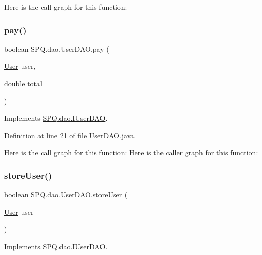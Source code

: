 Here is the call graph for this function\+:
\mbox{\label{class_s_p_q_1_1dao_1_1_user_d_a_o_a8223c677b1ae55147860ea533be434a7}} 
\subsubsection{\texorpdfstring{pay()}{pay()}}
{\footnotesize\ttfamily boolean S\+P\+Q.\+dao.\+User\+D\+A\+O.\+pay (\begin{DoxyParamCaption}\item[{\mbox{\hyperlink{class_s_p_q_1_1data_1_1_user}{User}}}]{user,  }\item[{double}]{total }\end{DoxyParamCaption})}



Implements \mbox{\hyperlink{interface_s_p_q_1_1dao_1_1_i_user_d_a_o_a8a4257a186a80d5842e26aeb1140a402}{S\+P\+Q.\+dao.\+I\+User\+D\+AO}}.



Definition at line 21 of file User\+D\+A\+O.\+java.

Here is the call graph for this function\+:
Here is the caller graph for this function\+:
\mbox{\label{class_s_p_q_1_1dao_1_1_user_d_a_o_ad86d4148c7f3fd960fb32de7c68f3f6a}} 
\subsubsection{\texorpdfstring{store\+User()}{storeUser()}\hspace{0.1cm}{\footnotesize\ttfamily [1/2]}}
{\footnotesize\ttfamily boolean S\+P\+Q.\+dao.\+User\+D\+A\+O.\+store\+User (\begin{DoxyParamCaption}\item[{\mbox{\hyperlink{class_s_p_q_1_1data_1_1_user}{User}}}]{user }\end{DoxyParamCaption})}



Implements \mbox{\hyperlink{interface_s_p_q_1_1dao_1_1_i_user_d_a_o_a286f084c9e920d1ce196658ab63ab0af}{S\+P\+Q.\+dao.\+I\+User\+D\+AO}}.



